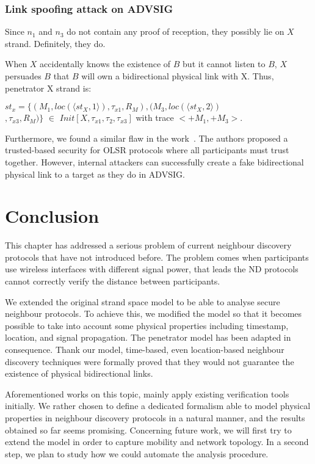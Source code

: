 \subsubsection*{Link spoofing attack on ADVSIG} 

Since $n_1$ and $n_3$ do not contain any proof of reception, they possibly lie on $X$ strand. Definitely, they do. 

When $X$ accidentally knows the existence of $B$ but it cannot listen to $B$, $X$ persuades $B$ that $B$ will own a bidirectional physical link with X. Thus, penetrator X strand is: 
\begin{flushleft}
$st_x = \{(M_1,loc(\langle st_X,1\rangle),\tau_{x1}, R_M) ,(M_3,loc(\langle st_X,2\rangle)$ \\ $,\tau_{x3}, R_M)\}$ $\in$ 
 $Init[X,\tau_{x1},\tau_{2},\tau_{x3}]$ with trace $<+M_1,+M_3>$.
\end{flushleft}

Furthermore, we found a similar flaw in the work~\cite{Adnane20131159}. The authors proposed a trusted-based security for OLSR protocols where all participants must trust together. However, internal attackers can successfully create a fake bidirectional physical link to a target as they do in ADVSIG. 

\section{Conclusion}

This chapter has addressed a serious problem of current neighbour discovery protocols that have not introduced before. The problem comes when participants use wireless interfaces with different signal power, that leads the ND protocols cannot correctly verify the distance between participants.  

We extended the original strand space model to be able to analyse secure neighbour protocols. To achieve this, we modified the model so that it becomes possible to take into account some physical properties including timestamp, location, and signal propagation. The penetrator model has been adapted in consequence. Thank our model, time-based, even location-based neighbour discovery techniques were formally proved that they would not guarantee the existence of physical bidirectional links. 

Aforementioned works on this topic, mainly apply existing verification tools initially. We rather chosen to define a dedicated formalism able to model physical properties in neighbour discovery protocols in a natural manner, and the results obtained so far seems promising. Concerning future work, we will first try to extend the model in order to capture mobility and network topology. In a second step, we plan to study how we could automate the analysis procedure.
